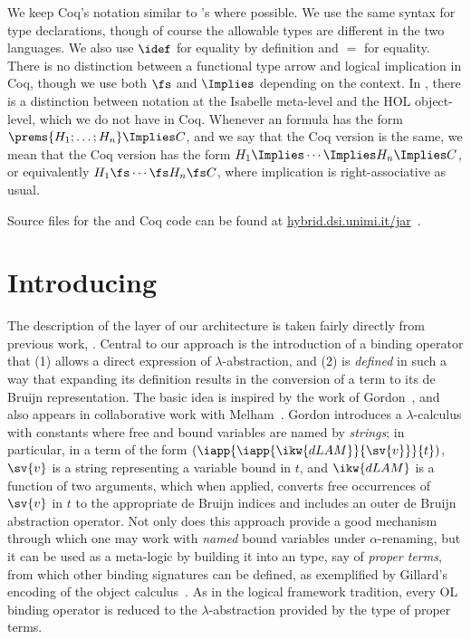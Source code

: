 \documentclass[final]{svjour3}
\begin{document}
\begin{notation}[Coq]
  We keep Coq's notation similar to \HOL's where possible.  We use the
  same syntax for type declarations, though of course the allowable
  types are different in the two languages.  We also use $\idef$ for
  equality by definition and $=$ for equality.  There is no
  distinction between a functional type arrow and logical implication
  in Coq, though we use both $\fs$ and $\Implies$ depending on the
  context.  In \HOL, there is a distinction between notation at the
  Isabelle meta-level and the HOL object-level, which we do not have
  in Coq. Whenever an \HOL formula has the form $\prems{H_1;\dots;
    H_n} \Implies C$, and we say that the Coq version is the same, we
  mean that the Coq version has the form $H_1 \Implies\cdots\Implies
  H_n \Implies C$, or equivalently $H_1 \fs\cdots\fs H_n \fs C$, where
  implication is right-associative as usual.
\end{notation}
Source files for the \HOL and Coq code can be found at
\url{hybrid.dsi.unimi.it/jar}~\cite{Hybrid}.


\section{Introducing \hybrid}
\label{sec:introh}



The description of the \hybrid layer of our architecture is taken fairly
directly from previous work, \viz \cite{Ambler02}.  Central to our
approach is the introduction of a binding operator that (1) allows a
direct expression of $\lambda$-abstraction, and (2) is \emph{defined}
in such a way that expanding its definition results in the conversion
of a term to its de Bruijn representation.  The basic idea is inspired
by the work of Gordon~\cite{Gor93}, and also appears in collaborative
work with Melham~\cite{Gordon96}.  Gordon introduces a
$\lambda$-calculus with constants where free and bound variables are
named by \emph{strings}; in particular, in a term of the form
$(\iapp{\iapp{\ikw{dLAM}}{\sv{v}}}{t})$, $\sv{v}$ is a string
representing a variable bound in $t$, and $\ikw{dLAM}$ is a function
of two arguments, which when applied, converts free occurrences of
$\sv{v}$ in $t$ to the appropriate de Bruijn indices and includes an
outer de Bruijn abstraction operator.  Not only does this approach
provide a good mechanism through which one may work with \emph{named}
bound variables under $\alpha$-renaming, but it can be used as a
meta-logic by building it into an \HOL type, say of \emph{proper
  terms}, from which other binding signatures can be defined, as
exemplified by Gillard's encoding of the object calculus~\cite{Gillard00}. As
in the logical framework tradition, every OL binding operator is
reduced to the $\lambda$-abstraction provided by the type of proper
terms.
\end{document}
